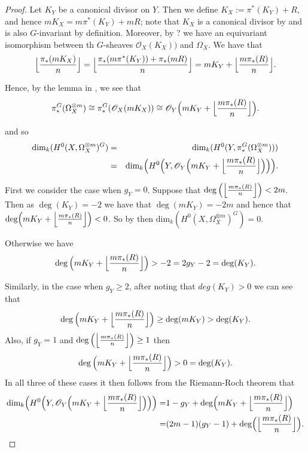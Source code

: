 \documentclass[11pt]{article} %
\begin{document}
\begin{proof}

Let $K_Y$ be a canonical divisor on $Y$. Then we define $K_X:=\pi^*(K_Y)+R$, and hence $mK_X=m\pi^*(K_Y)+mR$; note that $K_X$ is a canonical divisor by \citep[Chap. IV,\ prop 2.3]{hart} and is also $G$-invariant by definition. Moreover, by ? we have an equivariant isomorphism between th $G$-sheaves $\mathscr{O}_X(K_X))$ and $\Omega_X$. We have that
	\[ 
		\Big{\lfloor}{\frac{\pi_*(mK_X)}{n}} \Big{\rfloor}
		= \Big{\lfloor}{\frac{\pi_*(m\pi^*(K_Y))+\pi_*(mR)}{n}} \Big{\rfloor}
		= mK_Y+\Big{\lfloor} {\frac{m\pi_*(R)}{n}}\Big{\rfloor}.
	\]
	
Hence, by the lemma in \citep{faithfulaction}, we see that 
	\[
		\pi_*^G(\Omega_X^{\otimes m})\cong \pi_*^G(\mathscr{O}_X(mK_X))\cong \mathscr{O}_Y\Big(mK_Y 			+\Big{\lfloor}{\frac{m\pi_*(R)}{n}}\Big{\rfloor}\Big).
	\]

and so
	\begin{eqnarray*}
		\mbox{dim}_k(H^0(X,\Omega_{X}^{\otimes m})^G)&=&
		\mbox{dim}_k(H^0(Y,\pi_*^G(\Omega_{X}^{\otimes m})))\\
		&=&\mbox{dim}_k\Big(H^0\Big(Y,\mathscr{O}_Y\Big(mK_Y+\Big{\lfloor}{\frac{m\pi_*(R)}						{n}}\Big{\rfloor}\Big)\Big)\Big).
	\end{eqnarray*}

First we consider the case when $g_Y=0$. Suppose that $\deg\Big(\Big{\lfloor}{\frac{m\pi_* (R)}{n}}\Big{\rfloor}\Big) < 2m$. Then as $\deg(K_Y)=-2$ we have that $\deg(mK_Y)=-2m$ and hence that $\mbox{deg}\Big(mK_Y +\Big{\lfloor}{\frac{m\pi_*(R)}{n}}\Big{\rfloor}\Big)<0$. So by \citep[prop. 3, {\S}8]{fulton} then $\mbox{dim}_k(H^0(X,\Omega_{X}^{\otimes m})^G)=0.$


Otherwise we have 
	\[
		\deg\Big(mK_Y+\Big{\lfloor}\frac{m\pi_*(R)}{n}\Big{\rfloor}\Big)>-2=2g_Y-2=\deg(K_Y).
	\]

Similarly, in the case when $g_Y\geq2$, after noting that $deg(K_Y)>0$ we can see that
	\[
		\deg\Big(mK_Y+\Big{\lfloor}\frac{m\pi_*(R)}{n}\Big{\rfloor}\Big)\geq\deg(mK_Y)>\deg(K_Y).
	\]
Also, if $g_Y=1$ and $\deg\Big(\Big{\lfloor}\frac{m\pi_*(R)}{n}\Big{\rfloor}\Big)\geq1$ then
	\[
		\deg\Big(mK_Y+\Big
{\lfloor}\frac{m\pi_*(R)}{n}\Big{\rfloor}\Big)>0=\deg(K_Y).
	\]
In all three of these cases it then follows from the Riemann-Roch theorem \citep[Cor. 2, {\S}8]{fulton} that 
	\begin{eqnarray*}
			\mbox{dim}_k\Big(H^0\Big(Y,\mathscr{O}_Y\Big(mK_Y+\Big{\lfloor}{\frac{m\pi_*(R)}						{n}}\Big{\rfloor} \Big)\Big)\Big)= & 1-g_Y+\mbox{deg}\Big(mK_Y+\Big{\lfloor}{\frac{m\pi_*(R)}					{n}}\Big{\rfloor}\Big) \\
			= & (2m-1)(g_Y-1)+\mbox{deg}\Big(\Big{\lfloor}{\frac{m\pi_*(R)}{n}}\Big{\rfloor}\Big).
	\end{eqnarray*}


\end{proof}
\end{document}
